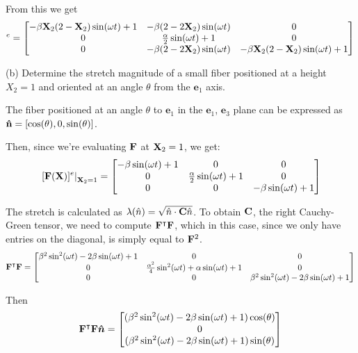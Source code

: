 From this we get
\begin{equation*}
  [\bn{F} (\bn{X})] ^e =   
\begin{bmatrix}
-\beta \bn{X}_2 (2-\bn{X}_2) \sin (\omega t) + 1 & -\beta (2-2\bn{X}_2) \sin(\omega t) & 0\\
0 & \frac{\alpha}{2} \sin (\omega t) +1 & 0\\
0 & -\beta (2-2\bn{X}_2) \sin(\omega t) & -\beta \bn{X}_2 (2-\bn{X}_2) \sin (\omega t) + 1
\end{bmatrix}
\end{equation*}

\medskip
(b) Determine the stretch magnitude of a small fiber positioned at a height $X_2 = 1$ and oriented at an angle $\theta$ from the $\bm{e}_1$ axis.

The fiber positioned at an angle $\theta$ to $\bm{e}_1$ in the $\bm{e}_1$, $\bm{e}_3$ plane can be expressed as $\mathbf{\hat{n}} = [\cos(\theta), 0, \sin(\theta)]$.

Then, since we're evaluating $\mathbf{F}$ at $\mathbf{X}_2 = 1$, we get:
\begin{equation*}
 \left. [\mathbf{F} (\mathbf{X})] ^e \right\rvert_{\mathbf{X}_2 = 1} =   
\begin{bmatrix}
-\beta \sin (\omega t) + 1 & 0 & 0\\
0 & \frac{\alpha}{2} \sin (\omega t) +1 & 0\\
0 & 0 & -\beta \sin (\omega t) + 1
\end{bmatrix}
\end{equation*}

The stretch is calculated as $\lambda(\hat{n}) = \sqrt{\hat{n} \cdot \mathbf{C} \hat{n}}$. To obtain $\mathbf{C}$, the right Cauchy-Green tensor, we need to compute $\mathbf{F}^\intercal \mathbf{F}$, which in this case, since we only have entries on the diagonal, is simply equal to $\mathbf{F}^2$.
\begin{equation*}
 \mathbf{F}^\intercal \mathbf{F} =   
\begin{bmatrix}
\beta^2 \sin^2 (\omega t) - 2 \beta \sin (\omega t) + 1 & 0 & 0\\
0 & \frac{\alpha^2}{4} \sin^2 (\omega t) + \alpha \sin (\omega t) +1 & 0\\
0 & 0 & \beta^2 \sin^2 (\omega t) - 2 \beta \sin (\omega t) + 1
\end{bmatrix}
\end{equation*}

Then
\begin{equation*}
 \mathbf{F}^\intercal \mathbf{F} \bm{\hat{n}} =   
\begin{bmatrix}
(\beta^2 \sin^2 (\omega t) - 2 \beta \sin (\omega t) + 1) \cos(\theta) \\
0 \\
(\beta^2 \sin^2 (\omega t) - 2 \beta \sin (\omega t) + 1) \sin(\theta)
\end{bmatrix}
\end{equation*}

